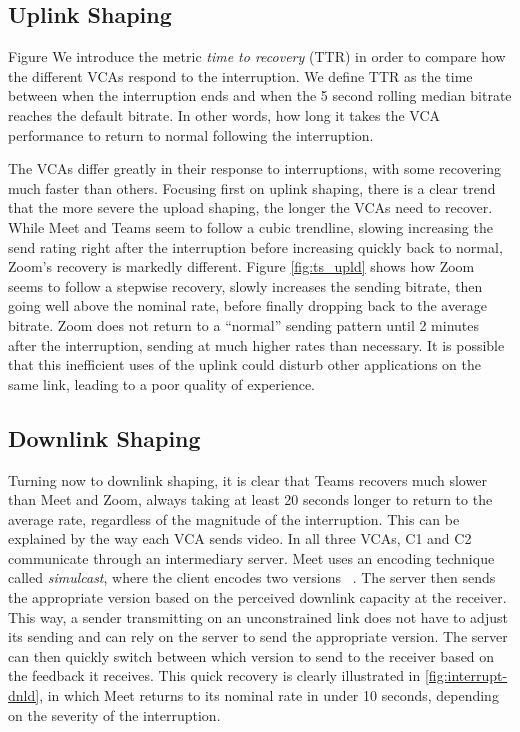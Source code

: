 \subsection{Uplink Shaping}
Figure 
We introduce the metric \textit{time to recovery} (TTR) in order to compare how the different VCAs respond to the interruption. We define TTR as the time 
between when the interruption ends and when the 5 second rolling median bitrate reaches the default bitrate. In other words, how long it takes the VCA performance to return to normal following the interruption. 

The VCAs differ greatly in their response to interruptions, with some recovering much faster than others. Focusing first on uplink shaping, there is a clear trend that the more severe the upload shaping, the longer the VCAs need to recover. While Meet and Teams seem to follow a cubic trendline, slowing increasing the send rating right after the interruption before increasing quickly back to normal, Zoom's recovery is markedly different. Figure \ref{fig:ts_upld} shows how Zoom seems to follow a stepwise recovery, slowly increases the sending bitrate, then going well above the nominal rate, before finally dropping back to the average bitrate. Zoom does not return to a ``normal'' sending pattern until 2 minutes after the interruption, sending at much higher rates than necessary. It is possible that this inefficient uses of the uplink could disturb other applications on the same link, leading to a poor quality of experience. 

\subsection{Downlink Shaping}
Turning now to downlink shaping, it is clear that Teams recovers much slower than Meet and Zoom, always taking at least 20 seconds longer to return to the average rate, regardless of the magnitude of the interruption. This can be explained by the way each VCA sends video. In all three VCAs, C1 and C2 communicate through an intermediary server. Meet uses an encoding technique called \textit{simulcast}, where the client encodes two versions ~\cite{nistico2020comparative}. The server then sends the appropriate version based on the perceived downlink capacity at the receiver. This way, a sender transmitting on an unconstrained link does not have to adjust its sending and can rely on the server to send the appropriate version. The server can then quickly switch between which version to send to the receiver based on the feedback it receives. This quick recovery is clearly illustrated in \ref{fig:interrupt-dnld}, in which Meet returns to its nominal rate in under 10 seconds, depending on the severity of the interruption.

